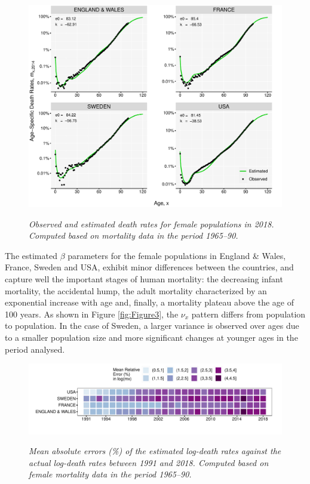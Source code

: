 \documentclass[risks,article,submit,moreauthors,pdftex]{Definitions/mdpi}
\begin{document}
\begin{figure}[!b]

{\centering \includegraphics[width=1\linewidth]{Figure4-1}}
\caption{\textit{Observed and estimated death rates for female populations in 2018. Computed based on mortality data in the period 1965--90.}}\label{fig:Figure4}
\end{figure}

The estimated $\beta$ parameters for the female populations in England \& Wales, France, Sweden and USA, exhibit minor differences between the countries, and capture well the important stages of human mortality: the decreasing infant mortality, the accidental hump, the adult mortality characterized by an exponential increase with age and, finally, a mortality plateau above the age of 100 years. As shown in Figure \ref{fig:Figure3}, the $\nu_x$ pattern differs from population to population. In the case of Sweden, a larger variance is observed over ages due to a smaller population size and more significant changes at younger ages in the period analysed. 

\begin{figure}[!t]

{\centering \includegraphics[width=1\linewidth]{Figure5-1}}

\caption{\textit{Mean absolute errors (\%) of the estimated log-death rates against the actual log-death rates between 1991 and 2018. Computed based on female mortality data in the period 1965--90.}}\label{fig:Figure5}
\end{figure}
\end{document}
